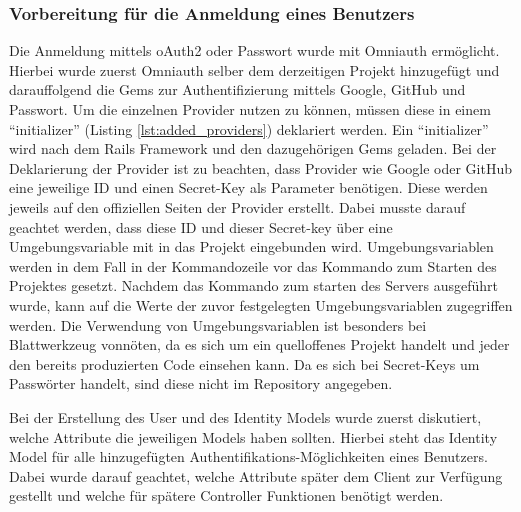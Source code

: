 \subsubsection{Vorbereitung für die Anmeldung eines Benutzers}
\label{sec: sign-in-imp}
Die Anmeldung mittels oAuth2 oder Passwort wurde mit Omniauth ermöglicht. Hierbei wurde zuerst Omniauth selber dem derzeitigen Projekt hinzugefügt und darauffolgend die Gems zur Authentifizierung mittels Google, GitHub und Passwort. Um die einzelnen Provider nutzen zu können, müssen diese in einem \enquote{initializer} (Listing \ref{lst:added_providers}) deklariert werden. Ein \enquote{initializer} wird nach dem Rails Framework und den dazugehörigen Gems geladen. Bei der Deklarierung der Provider ist zu beachten, dass Provider wie Google oder GitHub eine jeweilige ID und einen Secret-Key als Parameter benötigen. Diese werden jeweils auf den offiziellen Seiten der Provider erstellt. Dabei musste darauf geachtet werden, dass diese ID und dieser Secret-key über eine Umgebungsvariable mit in das Projekt eingebunden wird. Umgebungsvariablen werden in dem Fall in der Kommandozeile vor das Kommando zum Starten des Projektes gesetzt. Nachdem das Kommando zum starten des Servers ausgeführt wurde, kann auf die Werte der zuvor festgelegten Umgebungsvariablen zugegriffen werden. Die Verwendung von Umgebungsvariablen ist besonders bei Blattwerkzeug vonnöten, da es sich um ein quelloffenes Projekt handelt und jeder den bereits produzierten Code einsehen kann. Da es sich bei Secret-Keys um Passwörter handelt, sind diese nicht im Repository angegeben.

\begin{minipage}{\textwidth}
	
\end{minipage}


Bei der Erstellung des User und des Identity Models wurde zuerst diskutiert, welche Attribute die jeweiligen Models haben sollten. Hierbei steht das Identity Model für alle hinzugefügten Authentifikations-Möglichkeiten eines Benutzers. Dabei wurde darauf geachtet, welche Attribute später dem Client zur Verfügung gestellt und welche für spätere Controller Funktionen benötigt werden.

